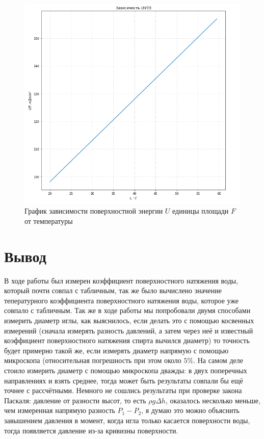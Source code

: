 \documentclass[a4paper,12pt]{article}
\begin{document}
\newpage


\begin{figure} [h!]
	\centering 
	\includegraphics[scale=0.57]{4.jpg} 
	\caption{График зависимости поверхностной энергии $U$ единицы площади $F$ от температуры} 
\end{figure}



\newpage


\section*{Вывод}

В ходе работы был измерен коэффициент поверхностного натяжения воды, который почти совпал с табличным, так же было вычислено значение тепературного коэффициента поверхностного натяжения воды, которое уже совпало с табличным. Так же в ходе работы мы попробовали двумя способами измерить диаметр иглы, как выяснилось, если делать это с помощью косвенных измерений (сначала измерять разность давлений, а затем через неё и известный коэффициент поверхностного натяжения спирта вычился диаметр) то точность будет примерно такой же, если измерять диаметр напрямую с помощью микроскопа (относительная погрешность при этом около $5\%$. На самом деле стоило измерить диаметр с помощью микроскопа дважды: в двух поперечных направлениях и взять среднее, тогда может быть результаты совпали бы ещё точнее с рассчётными. Немного не сошлись результаты при проверке закона Паскаля: давление от разности высот, то есть $\rho g \Delta h$, оказалось несколько меньше, чем измеренная напрямую разность $P_1 - P_2$, я думаю это можно объяснить завышением давления в момент, когда игла только касается поверхности воды, тогда появляется давление из-за кривизны поверхности. 
\end{document}
